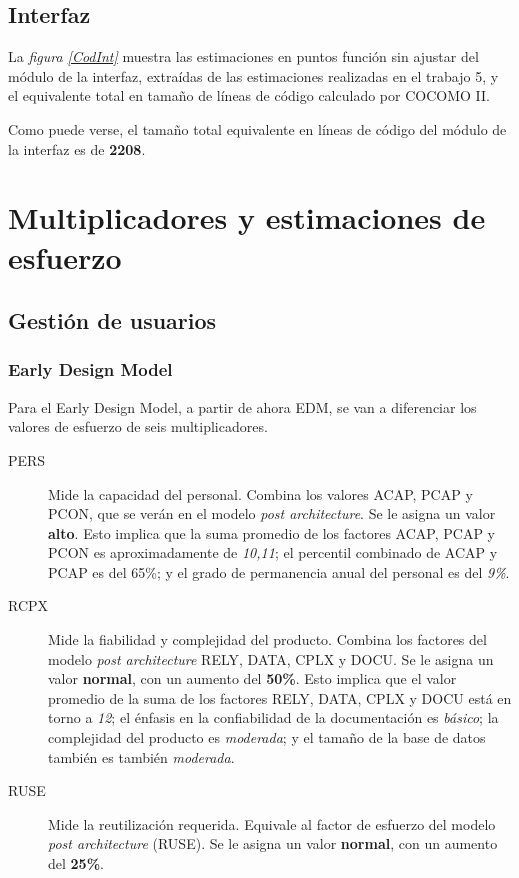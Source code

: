 \documentclass[11pt,a4paper,spanish,twoside]{book}
\begin{document}
\section{Interfaz}
La \emph{figura \ref{CodInt}} muestra las estimaciones en puntos función sin
ajustar del módulo de la interfaz, extraídas de las estimaciones realizadas en
el trabajo 5, y el equivalente total en tamaño de líneas de código calculado
por COCOMO II.


Como puede verse, el tamaño total equivalente en líneas de código del módulo
de la interfaz es de \textbf{2208}.

\chapter{Multiplicadores y estimaciones de esfuerzo}
\section{Gestión de usuarios}
\subsection{Early Design Model}
Para el Early Design Model, a partir de ahora EDM, se van a diferenciar los
valores de esfuerzo de seis multiplicadores.

\begin{description}
\item[PERS] Mide la capacidad del personal. Combina los valores ACAP, PCAP y
PCON, que se verán en el modelo \emph{post architecture}. Se le asigna un
valor \textbf{alto}. Esto implica que la suma promedio de los factores
ACAP, PCAP y PCON es aproximadamente de \emph{10,11}; el percentil combinado
de ACAP y PCAP es del 65\%; y el grado de permanencia anual del personal es
del \emph{9\%}.

\item[RCPX] Mide la fiabilidad y complejidad del producto. Combina los
factores del modelo \emph{post architecture} RELY, DATA, CPLX y DOCU. Se le
asigna un valor \textbf{normal}, con un aumento del \textbf{50\%}. Esto
implica que el valor promedio de la suma de los factores RELY, DATA, CPLX y
DOCU está en torno a \emph{12}; el énfasis en la confiabilidad de la
documentación es \emph{básico}; la complejidad del producto es
\emph{moderada}; y el tamaño de la base de datos también es también
\emph{moderada}.

\item[RUSE] Mide la reutilización requerida. Equivale al factor de esfuerzo
del modelo \emph{post architecture} (RUSE). Se le asigna un valor
\textbf{normal}, con un aumento del \textbf{25\%}.
\end{description}
\end{document}
